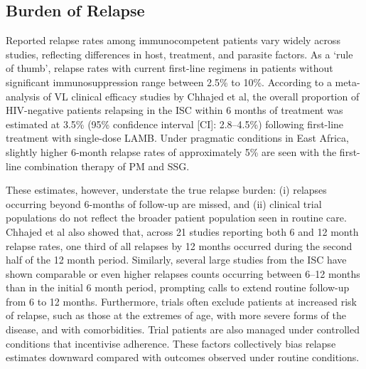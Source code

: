 
\subsection{Burden of Relapse\label{sec:burden-relapse}}

Reported relapse rates among immunocompetent patients vary widely across studies, reflecting differences in host, treatment, and parasite factors\cite{chhajed2024}. As a `rule of thumb', relapse rates with current first-line regimens in patients without significant immunosuppression range between 2.5\% to 10\%\cite{chhajed2024}. According to a meta-analysis of VL clinical efficacy studies by Chhajed et al, the overall proportion of HIV-negative patients relapsing in the ISC within 6 months of treatment was estimated at 3.5\% (95\% confidence interval [CI]: 2.8--4.5\%) following first-line treatment with single-dose LAMB\cite{chhajed2024}. Under pragmatic conditions in East Africa, slightly higher 6-month relapse rates of approximately 5\% are seen with the first-line combination therapy of PM and SSG\cite{kimutai2017,atia2015,melaku2007}.

These estimates, however, understate the true relapse burden: (i) relapses occurring beyond 6-months of follow-up are missed, and (ii) clinical trial populations do not reflect the broader patient population seen in routine care. Chhajed et al also showed that, across 21 studies reporting both 6 and 12 month relapse rates, one third of all relapses by 12 months occurred during the second half of the 12 month period\cite{chhajed2024}. Similarly, several large studies from the ISC have shown comparable or even higher relapses counts occurring between 6--12 months than in the initial 6 month period, prompting calls to extend routine follow-up from 6 to 12 months\cite{sundar2019,rijal2013,burza2013,burza2014,goyal2019}. Furthermore, trials often exclude patients at increased risk of relapse, such as those at the extremes of age, with more severe forms of the disease, and with comorbidities. Trial patients are also managed under controlled conditions that incentivise adherence. These factors collectively bias relapse estimates downward compared with outcomes observed under routine conditions.


